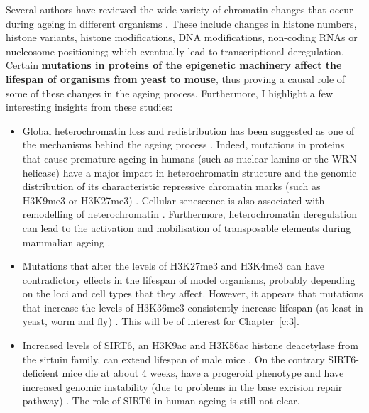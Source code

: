 \bigskip

Several authors have reviewed the wide variety of chromatin changes that occur during ageing in different organisms \cite{Booth2016,Benayoun2015a,Pal2016,Sen2016}. These include changes in histone numbers, histone variants, histone modifications, DNA modifications, non-coding RNAs or nucleosome positioning; which eventually lead to transcriptional deregulation. Certain \textbf{mutations in proteins of the epigenetic machinery affect the lifespan of organisms from yeast to mouse}, thus proving a causal role of some of these changes in the ageing process. Furthermore, I highlight a few interesting insights from these studies:

\begin{itemize}
	
	\item Global heterochromatin loss and redistribution has been suggested as one of the mechanisms behind the ageing process \cite{Villeponteau1997, Tsurumi2012}. Indeed, mutations in proteins that cause premature ageing in humans (such as nuclear lamins or the WRN helicase) have a major impact in heterochromatin structure and the genomic distribution of its characteristic repressive chromatin marks (such as H3K9me3 or H3K27me3) \cite{Zhang2015b}. Cellular senescence is also associated with remodelling of heterochromatin \cite{Zhang2007}. Furthermore, heterochromatin deregulation can lead to the activation and mobilisation of transposable elements during mammalian ageing \cite{DeCecco2013}. 
	
	\item Mutations that alter the levels of H3K27me3 and H3K4me3 can have contradictory effects in the lifespan of model organisms, probably depending on the loci and cell types that they affect. However, it appears that mutations that increase the levels of H3K36me3 consistently increase lifespan (at least in yeast, worm and fly) \cite{Booth2016,Benayoun2015a,Pal2016,Sen2016}. This will be of interest for Chapter~\ref{c:3}.
	
	\item Increased levels of SIRT6, an H3K9ac and H3K56ac histone deacetylase from the sirtuin family, can extend lifespan of male mice \cite{Kanfi2012}. On the contrary SIRT6-deficient mice die at about 4 weeks, have a progeroid phenotype  and have increased genomic instability (due to problems in the base excision repair pathway) \cite{Mostoslavsky2006}. The role of SIRT6 in human ageing is still not clear. 
	

\end{itemize}
